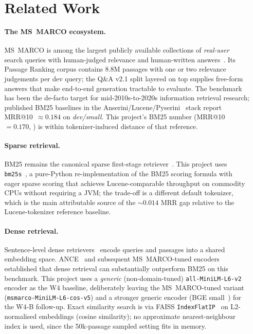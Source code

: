 \documentclass[11pt,a4paper]{article}
\makeatletter
\newcommand{\dataset}{MS~MARCO}
\newcommand{\devsmall}{\textit{dev/small}}
\newcommand{\msmarco}{MS~MARCO}
\newcommand{\mrr}{MRR@10}
\newcommand{\bmtwofive}{BM25}
\makeatother
\begin{document}
\clearpage\section{Related Work}
\label{sec:relwork}

\paragraph{The \dataset{} ecosystem.}  \dataset{} is among the
largest publicly available collections of \emph{real-user} search
queries with human-judged relevance and human-written
answers~\cite{bajaj2016msmarco,nguyen2016msmarcoqa}.  Its Passage
Ranking corpus contains 8.8M passages with one or two relevance
judgements per dev query; the Q\&A v2.1 split layered on top supplies
free-form answers that make end-to-end generation tractable to
evaluate.  The benchmark has been the de-facto target for
mid-2010s-to-2020s information retrieval research; published
\bmtwofive{} baselines in the
Anserini/Lucene/Pyserini~\cite{lin2021pyserini} stack report
\mrr{}~$\approx 0.184$ on \devsmall{}.  This project's \bmtwofive{}
number (\mrr{}~$=0.170$, ) is within tokenizer-induced
distance of that reference.

\paragraph{Sparse retrieval.}  \bmtwofive{} remains the canonical
sparse first-stage retriever~\cite{robertson2009bm25}.  This project
uses \texttt{bm25s}~\cite{lu2024bm25s}, a pure-Python re-implementation
of the BM25 scoring formula with eager sparse scoring that achieves
Lucene-comparable throughput on commodity CPUs without requiring a
JVM; the trade-off is a different default tokenizer, which is the
main attributable source of the $\sim\!0.014$ MRR gap relative to
the Lucene-tokenizer reference baseline.

\paragraph{Dense retrieval.}  Sentence-level dense
retrievers~\cite{reimers2019sbert} encode queries and passages into a
shared embedding space.  ANCE~\cite{xiong2021ance} and subsequent
\msmarco{}-tuned encoders established that dense retrieval can
substantially outperform \bmtwofive{} on this benchmark.  This project
uses a \emph{generic} (non-domain-tuned)
\texttt{all-MiniLM-L6-v2}~\cite{wang2020minilm} encoder as the W4
baseline, deliberately leaving the \msmarco{}-tuned variant
(\texttt{msmarco-MiniLM-L6-cos-v5}) and a stronger generic encoder
(BGE small~\cite{xiao2024bge}) for the W4-B follow-up.  Exact
similarity search is via FAISS \texttt{IndexFlatIP}~\cite{johnson2019faiss}
on L2-normalised embeddings (cosine similarity); no approximate
nearest-neighbour index is used, since the
50k-passage sampled setting fits in memory.
\end{document}
